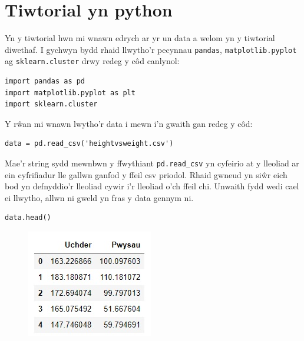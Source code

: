 

\section{Tiwtorial yn python}
Yn y tiwtorial hwn mi wnawn edrych ar yr un data a welom yn y tiwtorial diwethaf.
I gychwyn bydd rhaid llwytho'r pecynnau \texttt{pandas}, \texttt{matplotlib.pyplot} ag \texttt{sklearn.cluster} drwy redeg y c\^{o}d canlynol:

\begin{verbatim}
import pandas as pd
import matplotlib.pyplot as plt
import sklearn.cluster
\end{verbatim}

Y r\^{w}an mi wnawn lwytho'r data i mewn i'n gwaith gan redeg y c\^{o}d:

\begin{verbatim}
data = pd.read_csv('heightvsweight.csv')
\end{verbatim}

Mae'r string sydd mewnbwn y ffwythiant \texttt{pd.read_csv} yn cyfeirio at y lleoliad ar ein cyfrifiadur lle gallwn ganfod y ffeil csv priodol. Rhaid gwneud yn si\^{w}r eich bod yn defnyddio'r lleoliad cywir i'r lleoliad o'ch ffeil chi.
Unwaith fydd wedi cael ei llwytho, allwn ni gweld yn fras y data gennym ni. 

\begin{verbatim}
data.head()
\end{verbatim}

\begin{figure}[H]
\begin{center}
\includegraphics[width=0.35\linewidth]{../img/tabl1.jpg}
\end{center}
\label{fig:Data1}
\end{figure}

